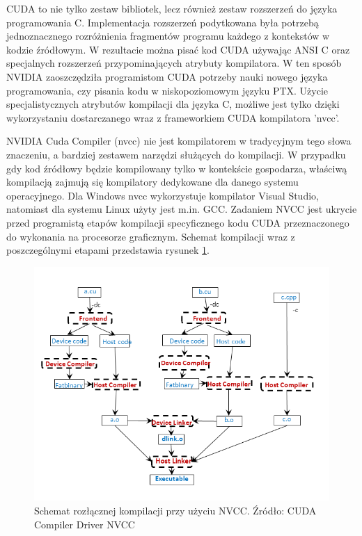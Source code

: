 CUDA to nie tylko zestaw bibliotek, lecz również zestaw rozszerzeń do języka
programowania C. Implementacja rozszerzeń podytkowana była potrzebą
jednoznacznego rozróżnienia fragmentów programu każdego z kontekstów w kodzie
źródłowym. W rezultacie można pisać kod CUDA używając ANSI C
oraz specjalnych rozszerzeń przypominających atrybuty kompilatora. W ten sposób
NVIDIA zaoszczędziła programistom CUDA potrzeby nauki nowego języka
programowania, czy pisania kodu w niskopoziomowym języku PTX. Użycie
specjalistycznych atrybutów kompilacji dla języka C, możliwe jest tylko dzięki
wykorzystaniu dostarczanego wraz z frameworkiem CUDA kompilatora 'nvcc'.

NVIDIA Cuda Compiler (nvcc) nie jest kompilatorem w tradycyjnym tego słowa
znaczeniu, a bardziej zestawem narzędzi służących do kompilacji. W przypadku gdy
kod źródłowy będzie kompilowany tylko w kontekście gospodarza, właściwą kompilacją
zajmują się kompilatory dedykowane dla danego systemu operacyjnego. Dla
Windows nvcc wykorzystuje kompilator Visual Studio, natomiast dla systemu Linux
użyty jest m.in. GCC. Zadaniem NVCC jest ukrycie przed programistą etapów kompilacji
specyficznego kodu CUDA przeznaczonego do wykonania na procesorze
graficznym. Schemat kompilacji wraz z poszczególnymi etapami przedstawia rysunek
\ref{compilation}.

\begin{figure}[H]
\centering
\includegraphics[scale=0.8]{images/nvcc-options-for-separate-compilation.png}
\caption{Schemat rozłącznej kompilacji przy użyciu NVCC. Źródło: CUDA Compiler Driver NVCC}
\label{compilation}
\end{figure}

